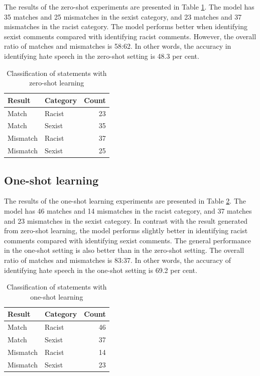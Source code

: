 \documentclass[12pt,]{article}
\begin{document}
The results of the zero-shot experiments are presented in Table \ref{tab:zeroshot}. The model has 35 matches and 25 mismatches in the sexist category, and 23 matches and 37 mismatches in the racist category. The model performs better when identifying sexist comments compared with identifying racist comments. However, the overall ratio of matches and mismatches is 58:62. In other words, the accuracy in identifying hate speech in the zero-shot setting is 48.3 per cent.

\begin{table}

\caption{\label{tab:zeroshot}Classification of statements with zero-shot learning}
\centering
\begin{tabular}[t]{llr}
\toprule
Result & Category & Count\\
\midrule
Match & Racist & 23\\
Match & Sexist & 35\\
Mismatch & Racist & 37\\
Mismatch & Sexist & 25\\
\bottomrule
\end{tabular}
\end{table}

\hypertarget{one-shot-learning-1}{%
\subsection{One-shot learning}\label{one-shot-learning-1}}

The results of the one-shot learning experiments are presented in Table \ref{tab:oneshot}. The model has 46 matches and 14 mismatches in the racist category, and 37 matches and 23 mismatches in the sexist category. In contrast with the result generated from zero-shot learning, the model performs slightly better in identifying racist comments compared with identifying sexist comments. The general performance in the one-shot setting is also better than in the zero-shot setting. The overall ratio of matches and mismatches is 83:37. In other words, the accuracy of identifying hate speech in the one-shot setting is 69.2 per cent.

\begin{table}

\caption{\label{tab:oneshot}Classification of statements with one-shot learning}
\centering
\begin{tabular}[t]{llr}
\toprule
Result & Category & Count\\
\midrule
Match & Racist & 46\\
Match & Sexist & 37\\
Mismatch & Racist & 14\\
Mismatch & Sexist & 23\\
\bottomrule
\end{tabular}
\end{table}
\end{document}
